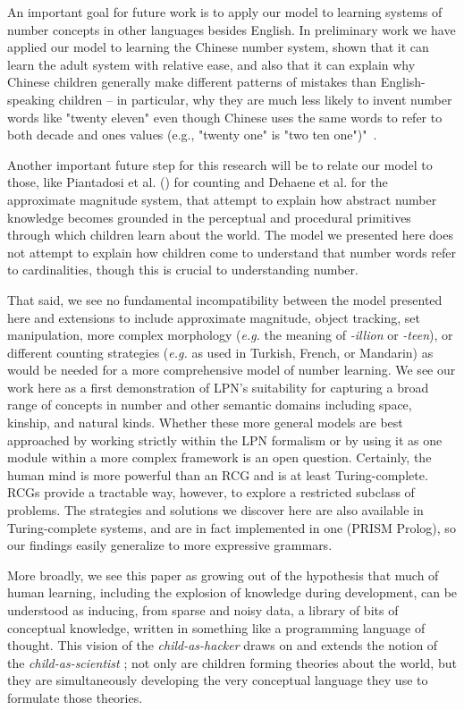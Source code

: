 \documentclass[10pt,letterpaper]{article}
\begin{document}
An important goal for future work is to apply our model to learning
systems of number concepts in other languages besides English.  In
preliminary work we have applied our model to learning the Chinese
number system, shown that it can learn the adult system with relative
ease, and also that it can explain why Chinese children generally make
different patterns of mistakes than English-speaking children -- in
particular, why they are much less likely to invent number words like
"twenty eleven" even though Chinese uses the same words to refer to
both decade and ones values (e.g., "twenty one" is "two ten one")"~\citep{miller1987counting}.

Another important future step for this research will be to relate our
model to those, like Piantadosi et al. (\citeyear{PianGoodTen2012})
for counting and Dehaene et al. for the approximate magnitude system,
that attempt to explain how abstract number knowledge becomes grounded
in the perceptual and procedural primitives through which children
learn about the world. The model we presented here does not attempt to
explain how children come to understand that number words refer to
cardinalities, though this is crucial to understanding number.

That said, we see no fundamental incompatibility between the model
presented here and extensions to include approximate magnitude, object
tracking, set manipulation, more complex morphology ({\it e.g.} the
meaning of \emph{-illion} or \emph{-teen}), or different counting
strategies ({\it e.g.} as used in Turkish, French, or Mandarin) as
would be needed for a more comprehensive model of number learning. We
see our work here as a first demonstration of LPN's suitability for
capturing a broad range of concepts in number and other semantic
domains including space, kinship, and natural kinds.  Whether these
more general models are best approached by working strictly within the
LPN formalism or by using it as one module within a more complex
framework is an open question. Certainly, the human mind is more
powerful than an RCG and is at least Turing-complete.  RCGs provide a
tractable way, however, to explore a restricted subclass of
problems. The strategies and solutions we discover here are also
available in Turing-complete systems, and are in fact implemented in
one (PRISM Prolog), so our findings easily generalize to more
expressive grammars.

More broadly, we see this paper as growing out of the hypothesis that
much of human learning, including the explosion of knowledge during
development, can be understood as inducing, from sparse and noisy data,
a library of bits of conceptual knowledge, written in something like a
programming language of thought. This vision of the
\emph{child-as-hacker} draws on and extends the notion of the
\emph{child-as-scientist} \citep{gopnik1996scientist}; not only are
children forming theories about the world, but they are simultaneously
developing the very conceptual language they use to formulate those
theories.
\end{document}
